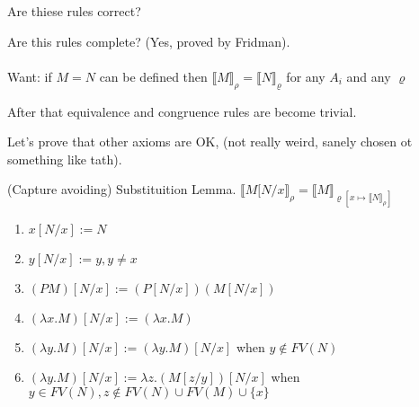 \documentclass[a4paper,10pt]{book}
\newcommand{\sem}[2]{ \llbracket#1\rrbracket_{#2} }
\begin{document}
Are thiese rules correct?

Are this rules complete? (Yes, proved by Fridman).

\paragraph{}
Want: if $M=N$ can be defined then $\sem{M}{\rho} = \llbracket N \rrbracket_\varrho$ for any $A_i$  and any $\varrho$

After that equivalence and congruence rules are become trivial.

Let's prove that other axioms are OK, (not really weird, sanely chosen ot something like tath).





(Capture avoiding) Substituition Lemma.
$\llbracket M[N/x\rrbracket_\rho = \llbracket M\rrbracket_{\varrho
[x \mapsto \llbracket N\rrbracket_\rho]}$


\begin{enumerate}
\item $x[N/x] := N$
\item $y[N/x] := y, y \neq x$
\item $(PM)[N/x] := (P[N/x]) (M[N/x])$
\item $(\lambda x . M)[N/x] := (\lambda x . M)$
\item $(\lambda y . M)[N/x] := (\lambda y . M)[N/x]$ when $y \not\in FV(N)$
\item $(\lambda y . M)[N/x] := \lambda z . (M[z/y])[N/x]$ when $y \in FV(N), z \not\in FV(N) \cup FV(M) \cup \{x\}$
\end{enumerate}
\end{document}
